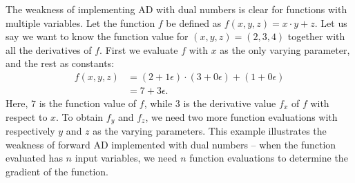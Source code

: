 The weakness of implementing AD with dual numbers is clear for functions with multiple variables. Let the function $f$ be defined as $f(x,y,z) = x\cdot y + z$. Let us say we want to know the function value for $(x,y,z) = (2,3,4)$ together with all the derivatives of $f$. First we evaluate $f$ with $x$ as the only varying parameter, and the rest as constants:
\begin{align*}
    f(x,y,z) &= (2+1\epsilon)\cdot(3+0\epsilon) + (1+0\epsilon)\\
        &=7+3\epsilon.
\end{align*}
Here, $7$ is the function value of $f$, while $3$ is the derivative value $f_x$ of $f$ with respect to $x$. To obtain $f_y$ and $f_z$, we need two more function evaluations with respectively $y$ and $z$ as the varying parameters. This example illustrates the weakness of forward AD implemented with dual numbers -- when the function evaluated has $n$ input variables, we need $n$ function evaluations to determine the gradient of the function.


